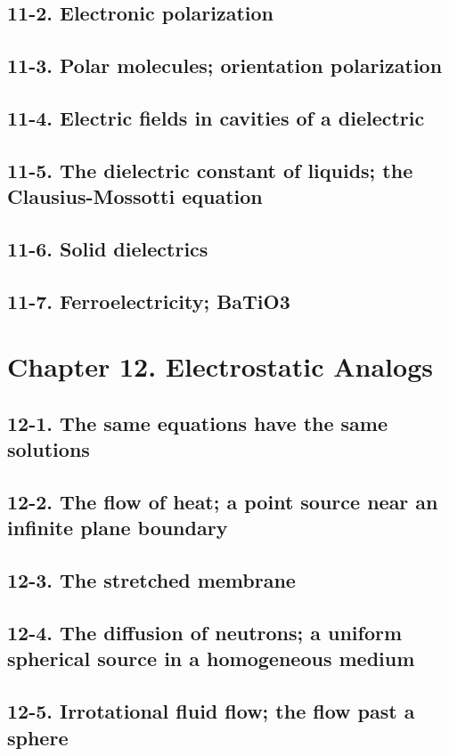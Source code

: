 \documentclass{article}
\begin{document}
\subsection{11-2. Electronic polarization}
\subsection{11-3. Polar molecules; orientation polarization}
\subsection{11-4. Electric fields in cavities of a dielectric}
\subsection{11-5. The dielectric constant of liquids; the Clausius-Mossotti equation}
\subsection{11-6. Solid dielectrics}
\subsection{11-7. Ferroelectricity; BaTiO3}
\section{Chapter 12. Electrostatic Analogs}
\subsection{12-1. The same equations have the same solutions}
\subsection{12-2. The flow of heat; a point source near an infinite plane boundary}
\subsection{12-3. The stretched membrane}
\subsection{12-4. The diffusion of neutrons; a uniform spherical source in a homogeneous medium}
\subsection{12-5. Irrotational fluid flow; the flow past a sphere}
\end{document}
